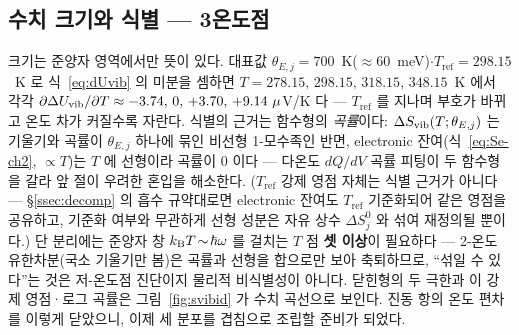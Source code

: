 \subsection{수치 크기와 식별 --- 3온도점}\label{ssec:einstein-numid}
크기는 준양자 영역에서만 뜻이 있다. 대표값 $\theta_{E,j}=700$~K($\approx60$~meV)$\cdot$$T_\mathrm{ref}=298.15$~K
로 식~\eqref{eq:dUvib} 의 미분을 셈하면 $T=278.15,\,298.15,\,318.15,\,348.15$~K 에서 각각 $\partial\Delta
U_{\mathrm{vib}}/\partial T\approx-3.74,\,0,\,+3.70,\,+9.14~\mu$V/K 다 --- $T_\mathrm{ref}$ 를 지나며 부호가 바뀌고 온도
차가 커질수록 자란다. 식별의 근거는 함수형의 \emph{곡률}이다: $\Delta S_{\mathrm{vib}}(T;\theta_{E,j})$ 는 기울기와
곡률이 $\theta_{E,j}$ 하나에 묶인 비선형 1-모수족인 반면, electronic 잔여(식~\eqref{eq:Se-ch2}, $\propto T$)는
$T$ 에 선형이라 곡률이 $0$ 이다 --- 다온도 $dQ/dV$ 곡률 피팅이 두 함수형을 갈라 앞 절이 우려한 혼입을
해소한다. ($T_\mathrm{ref}$ 강제 영점 자체는 식별 근거가 아니다 --- \S\ref{ssec:decomp} 의 흡수 규약대로면
electronic 잔여도 $T_\mathrm{ref}$ 기준화되어 같은 영점을 공유하고, 기준화 여부와 무관하게 선형 성분은 자유
상수 $\Delta S^0_j$ 와 섞여 재정의될 뿐이다.) 단 분리에는 준양자 창 $k_{\mathrm B} T\!\sim\!\hbar\omega$ 를 걸치는 $T$ 점
\textbf{셋 이상}이 필요하다 --- 2-온도 유한차분(국소 기울기만 봄)은 곡률과 선형을 합으로만 보아 축퇴하므로,
``섞일 수 있다''는 것은 저-온도점 진단이지 물리적 비식별성이 아니다. 닫힌형의 두 극한과 이 강제 영점·로그
곡률은 그림~\ref{fig:svibid} 가 수치 곡선으로 보인다. 진동 항의 온도 편차를 이렇게 닫았으니,
이제 세 분포를 겹침으로 조립할 준비가 되었다.

